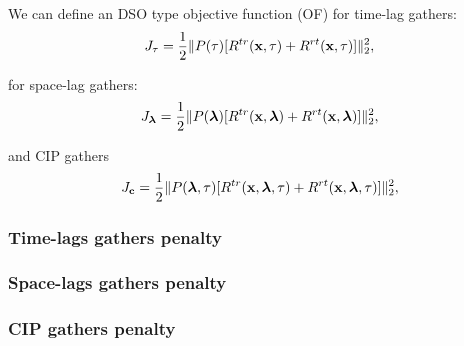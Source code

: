  \begin{frame} 
  \begin{columns} 
      \vspace{-.2in}
      \vspace{.4in}
      \vspace{.2in}
      \vspace{-.1in}
   \end{columns}
\end{frame}
 \begin{frame} 
  \begin{columns} 
      \vspace{-.2in}
      \vspace{.4in}
      \vspace{.2in}
      \vspace{-.1in}
   \end{columns}
\end{frame}

\begin{frame}
We can define an DSO type objective function (OF) for time-lag gathers:
\[
    J_{\tau}= \frac{1}{2} \lVert P({\tau})[R^{tr}({\bf x},\tau)+R^{rt}({\bf x},\tau)]\rVert^2_2,
\]
\end{frame}
\begin{frame}
 for space-lag gathers:
\[
    J_{{\boldsymbol{\lambda}}}= \frac{1}{2} \lVert P({{\boldsymbol{\lambda}}})[R^{tr}({\bf x},{\boldsymbol{\lambda}})+R^{rt}({\bf x},{\boldsymbol{\lambda}})]\rVert^2_2,
\]
\end{frame}
\begin{frame}
 and CIP gathers
\[
    J_{{{\bf c}}}= \frac{1}{2} \lVert P({{\boldsymbol{\lambda}},\tau})[R^{tr}({\bf x},{\boldsymbol{\lambda}},\tau)+R^{rt}({\bf x},{\boldsymbol{\lambda}},\tau)]\rVert^2_2,
\]

\end{frame}



\begin{frame}\frametitle{Time-lags gathers penalty}
      
\end{frame}
\begin{frame}\frametitle{Space-lags gathers penalty}
\end{frame}
\begin{frame}\frametitle{CIP gathers penalty}
\end{frame}


